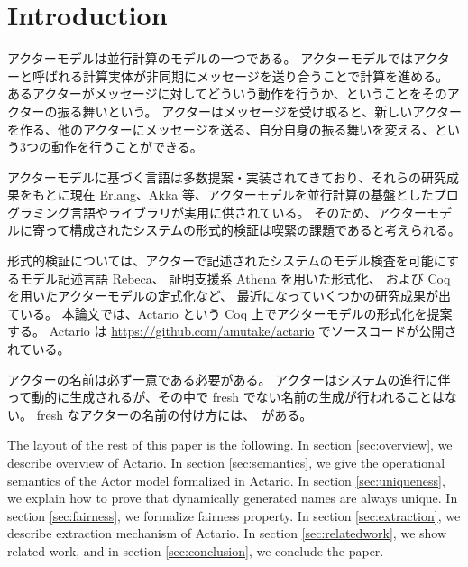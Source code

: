 \section{Introduction}
アクターモデルは並行計算のモデルの一つである\cite{Agha:1986aa}。
アクターモデルではアクターと呼ばれる計算実体が非同期にメッセージを送り合うことで計算を進める。
あるアクターがメッセージに対してどういう動作を行うか、ということをそのアクターの振る舞いという。
アクターはメッセージを受け取ると、新しいアクターを作る、他のアクターにメッセージを送る、自分自身の振る舞いを変える、という3つの動作を行うことができる。

アクターモデルに基づく言語は多数提案・実装されてきており、それらの研究成果をもとに現在 Erlang、Akka 等、アクターモデルを並行計算の基盤としたプログラミング言語やライブラリが実用に供されている。
そのため、アクターモデルに寄って構成されたシステムの形式的検証は喫緊の課題であると考えられる。

形式的検証については、アクターで記述されたシステムのモデル検査を可能にするモデル記述言語 Rebeca、
証明支援系 Athena を用いた形式化、
および Coq を用いたアクターモデルの定式化など、
最近になっていくつかの研究成果が出ている。
本論文では、Actario という Coq 上でアクターモデルの形式化を提案する。
Actario は \url{https://github.com/amutake/actario} でソースコードが公開されている。


アクターの名前は必ず一意である必要がある。
アクターはシステムの進行に伴って動的に生成されるが、その中で fresh でない名前の生成が行われることはない。
fresh なアクターの名前の付け方には、~がある。



The layout of the rest of this paper is the following.
In section \ref{sec:overview}, we describe overview of Actario.
In section \ref{sec:semantics}, we give the operational semantics of the Actor model formalized in Actario.
In section \ref{sec:uniqueness}, we explain how to prove that dynamically generated names are always unique.
In section \ref{sec:fairness}, we formalize fairness property.
In section \ref{sec:extraction}, we describe extraction mechanism of Actario.
In section \ref{sec:relatedwork}, we show related work, and in section \ref{sec:conclusion}, we conclude the paper.

